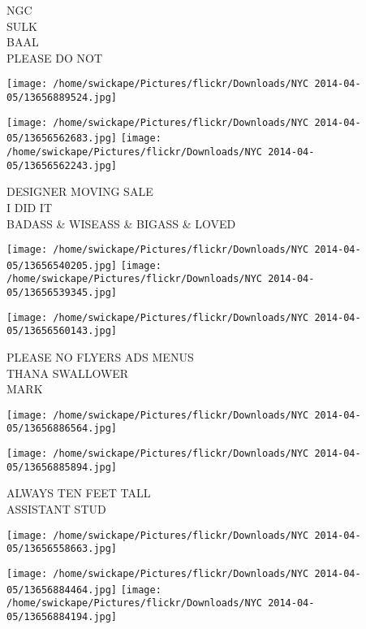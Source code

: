 \documentclass[10pt,letterpaper]{article}
\begin{document}
NGC\\
SULK\\
BAAL\\
PLEASE DO NOT\\
\pagebreak

\texttt{[image: /home/swickape/Pictures/flickr/Downloads/NYC 2014-04-05/13656889524.jpg]}

\vspace{0.25in}
\texttt{[image: /home/swickape/Pictures/flickr/Downloads/NYC 2014-04-05/13656562683.jpg]}
\texttt{[image: /home/swickape/Pictures/flickr/Downloads/NYC 2014-04-05/13656562243.jpg]}

DESIGNER MOVING SALE\\
I DID IT\\
BADASS \& WISEASS \& BIGASS \& LOVED\\
\pagebreak

\texttt{[image: /home/swickape/Pictures/flickr/Downloads/NYC 2014-04-05/13656540205.jpg]}
\texttt{[image: /home/swickape/Pictures/flickr/Downloads/NYC 2014-04-05/13656539345.jpg]}

\vspace{0.25in}
\texttt{[image: /home/swickape/Pictures/flickr/Downloads/NYC 2014-04-05/13656560143.jpg]}

PLEASE NO FLYERS ADS MENUS\\
THANA SWALLOWER\\
MARK\\
\pagebreak

\texttt{[image: /home/swickape/Pictures/flickr/Downloads/NYC 2014-04-05/13656886564.jpg]}

\vspace{0.25in}
\texttt{[image: /home/swickape/Pictures/flickr/Downloads/NYC 2014-04-05/13656885894.jpg]}

ALWAYS TEN FEET TALL\\
ASSISTANT STUD\\
\pagebreak

\texttt{[image: /home/swickape/Pictures/flickr/Downloads/NYC 2014-04-05/13656558663.jpg]}

\vspace{0.25in}
\texttt{[image: /home/swickape/Pictures/flickr/Downloads/NYC 2014-04-05/13656884464.jpg]}
\texttt{[image: /home/swickape/Pictures/flickr/Downloads/NYC 2014-04-05/13656884194.jpg]}
\end{document}
